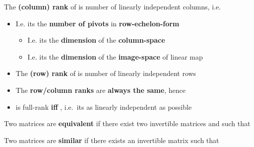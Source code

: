 \hSep %

The \textbf{(column) rank} of  is number of linearly
independent columns, i.e.~

\begin{itemize}

      \item
            I.e. its the \textbf{number of pivots} in \textbf{row-echelon-form}

            \begin{itemize}

                  \item
                        I.e. its the \textbf{dimension} of the \textbf{column-space}
                  \item
                        I.e. its the \textbf{dimension} of the \textbf{image-space}
                         of linear map
            \end{itemize}
      \item
            The \textbf{(row) rank} of  is number of linearly
            independent rows
      \item
            The \textbf{row/column ranks} are \textbf{always the same}, hence
      \item
             is full-rank \textbf{iff}
            , i.e.~its as linearly independent
            as possible
\end{itemize}

\hSep %

Two matrices
are \textbf{equivalent} if there exist two invertible matrices
  and
 such that

Two matrices
are \textbf{similar} if there exists an invertible matrix
  such that

